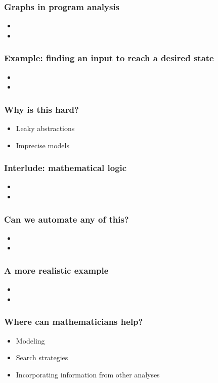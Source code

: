 \documentclass[11pt]{beamer}
\begin{document}
  \begin{frame}
\frametitle{Graphs in program analysis}
  \begin{itemize}
  \item{}
    \medskip
  \item{}
      \end{itemize}
  \end{frame}

\begin{frame}
\frametitle{Example: finding an input to reach a desired state}
  \begin{itemize}
  \item{}
    \medskip
  \item{}
      \end{itemize}
  \end{frame}

\begin{frame}
\frametitle{Why is this hard?}
  \begin{itemize}
  \item{Leaky abstractions}
    \medskip
  \item{Imprecise models}
    \end{itemize}
  \end{frame}
  
  
\begin{frame}
\frametitle{Interlude: mathematical logic}
  \begin{itemize}
  \item{}
    \medskip
  \item{}
      \end{itemize}
  \end{frame}


 \begin{frame}
\frametitle{Can we automate any of this?}
  \begin{itemize}
  \item{}
    \medskip
  \item{}
      \end{itemize}
  \end{frame}

  \begin{frame}
\frametitle{A more realistic example}
  \begin{itemize}
  \item{}
    \medskip
  \item{}
      \end{itemize}
  \end{frame}

\begin{frame}
\frametitle{Where can mathematicians help?}
\begin{itemize}
\item{Modeling}
  \medskip
\item{Search strategies}
  \medskip
\item{Incorporating information from other analyses}
  \end{itemize}
\end{frame}
\end{document}
